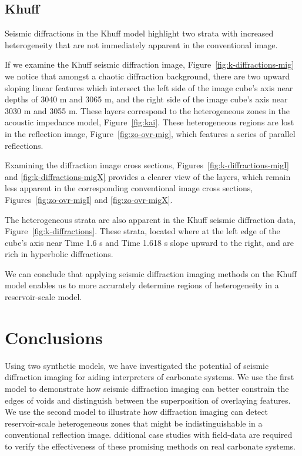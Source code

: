 \subsection{Khuff}
\par
Seismic diffractions in the Khuff model highlight two strata with increased heterogeneity that are not immediately apparent in the conventional image.
\par
If we examine the Khuff seismic diffraction image, Figure~\ref{fig:k-diffractions-mig} we notice that amongst a chaotic diffraction background, there are two upward sloping linear features which intersect the left side of the image cube's  axis near depths of 3040 m and 3065 m, and the right side of the image cube's  axis near 3030 m and 3055 m.  These layers correspond to the heterogeneous zones in the acoustic impedance model, Figure~\ref{fig:kai}.  These heterogeneous regions are lost in the reflection image, Figure~\ref{fig:zo-ovr-mig}, which features a series of parallel reflections.
\par
Examining the diffraction image cross sections, Figures~\ref{fig:k-diffractions-migI} and \ref{fig:k-diffractions-migX} provides a clearer view of the  layers, which remain less apparent in the corresponding conventional image cross sections, Figures~\ref{fig:zo-ovr-migI} and \ref{fig:zo-ovr-migX}.
\par
The heterogeneous strata are also apparent in the Khuff seismic diffraction data, Figure~\ref{fig:k-diffractions}.  These strata, located where at the left edge of the cube's  axis near Time 1.6 s and Time 1.618 s slope upward to the right, and are rich in hyperbolic diffractions.
\par
We can conclude that applying seismic diffraction imaging methods on the Khuff model enables us to more accurately determine regions of heterogeneity in a reservoir-scale model.

\section{Conclusions}
Using two synthetic models, we have investigated the potential of seismic diffraction imaging for aiding interpreters of carbonate systems.  We use the first model to demonstrate how seismic diffraction imaging can better constrain the edges of voids and distinguish between the superposition of overlaying features.  We use the second model to illustrate how diffraction imaging can detect reservoir-scale heterogeneous zones that might be indistinguishable in a conventional reflection image.  dditional case studies with field-data are required to verify the effectiveness of these promising methods on real carbonate systems.
